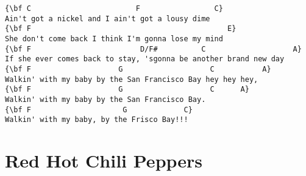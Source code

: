 \documentclass[a4paper]{article}
\begin{document}
\begin{Verbatim}[commandchars=\\\{\}]
{\bf C                        F                 C}
Ain't got a nickel and I ain't got a lousy dime
{\bf F                                             E}
She don't come back I think I'm gonna lose my mind
{\bf F                         D/F#          C                    A}
If she ever comes back to stay, 'sgonna be another brand new day
{\bf F                    G                    C           A}
Walkin' with my baby by the San Francisco Bay hey hey hey,
{\bf F                    G                    C      A}
Walkin' with my baby by the San Francisco Bay. 
{\bf F                     G             C}
Walkin' with my baby, by the Frisco Bay!!!

\end{Verbatim}
\newpage
\section{Red Hot Chili Peppers}
\end{document}

